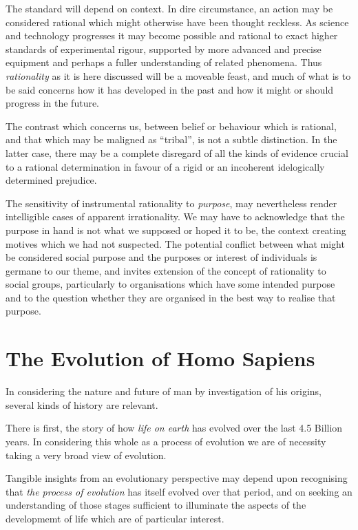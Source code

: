 \documentclass[10pt,titlepage]{book}
\begin{document}
The standard will depend on context.
In dire circumstance, an action may be considered rational which might otherwise have been thought reckless.
As science and technology progresses it may become possible and rational to exact higher standards of experimental rigour, supported by more advanced and precise equipment and perhaps a fuller understanding of related phenomena.
Thus \emph{rationality} as it is here discussed will be a moveable feast, and much of what is to be said concerns how it has developed in the past and how it might or should progress in the future.

The contrast which concerns us, between belief or behaviour which is rational, and that which may be maligned as ``tribal'', is not a subtle distinction.
In the latter case, there may be a complete disregard of all the kinds of evidence crucial to a rational determination in favour of a rigid or an incoherent idelogically determined prejudice.

The sensitivity of instrumental rationality to \emph{purpose}, may nevertheless render intelligible cases of apparent irrationality.
We may have to acknowledge that the purpose in hand is not what we supposed or hoped it to be, the context creating motives which we had not suspected.
The potential conflict between what might be considered social purpose and the purposes or interest of individuals is germane to our theme, and invites extension of the concept of rationality to social groups, particularly to organisations which have some intended purpose and to the question whether they are organised in the best way to realise that purpose.

\section{The Evolution of Homo Sapiens}

In considering the nature and future of man by investigation of his origins, several kinds of history are relevant.

There is first, the story of how \emph{life on earth} has evolved over the last 4.5 Billion years.
In considering this whole as a process of evolution we are of necessity taking a very broad view of evolution.

Tangible insights from an evolutionary perspective may depend upon recognising that \emph{the process of evolution} has itself evolved over that period, and on seeking an understanding of those stages sufficient to illuminate the aspects of the developmemt of life which are of particular interest.
\end{document}
